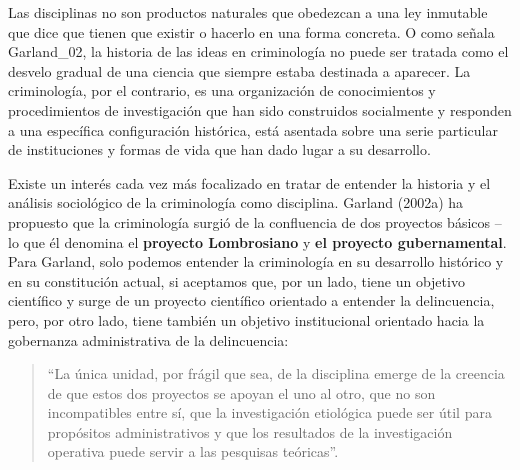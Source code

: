 \documentclass[
  spanish,
  letterpaper,
  DIV=11,
  numbers=noendperiod]{scrreprt}
\begin{document}
Las disciplinas no son productos naturales que obedezcan a una ley
inmutable que dice que tienen que existir o hacerlo en una forma
concreta. O como señala Garland\_02, la historia de las ideas en
criminología no puede ser tratada como el desvelo gradual de una ciencia
que siempre estaba destinada a aparecer. La criminología, por el
contrario, es una organización de conocimientos y procedimientos de
investigación que han sido construidos socialmente y responden a una
específica configuración histórica, está asentada sobre una serie
particular de instituciones y formas de vida que han dado lugar a su
desarrollo.

Existe un interés cada vez más focalizado en tratar de entender la
historia y el análisis sociológico de la criminología como disciplina.
Garland (2002a) ha propuesto que la criminología surgió de la
confluencia de dos proyectos básicos -- lo que él denomina el
\textbf{proyecto Lombrosiano} y \textbf{el proyecto gubernamental}. Para
Garland, solo podemos entender la criminología en su desarrollo
histórico y en su constitución actual, si aceptamos que, por un lado,
tiene un objetivo científico y surge de un proyecto científico orientado
a entender la delincuencia, pero, por otro lado, tiene también un
objetivo institucional orientado hacia la gobernanza administrativa de
la delincuencia:

\begin{quote}
``La única unidad, por frágil que sea, de la disciplina emerge de la
creencia de que estos dos proyectos se apoyan el uno al otro, que no son
incompatibles entre sí, que la investigación etiológica puede ser útil
para propósitos administrativos y que los resultados de la investigación
operativa puede servir a las pesquisas teóricas''.
\end{quote}
\end{document}
